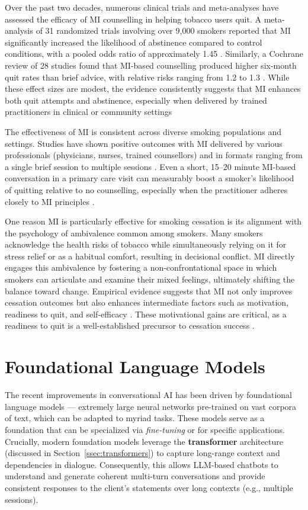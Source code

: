 Over the past two decades, numerous clinical trials and meta-analyses have assessed the efficacy of MI counselling in helping tobacco users quit. A meta-analysis of 31 randomized trials involving over 9,000 smokers reported that MI significantly increased the likelihood of abstinence compared to control conditions, with a pooled odds ratio of approximately 1.45 \cite{Heckman2010}. Similarly, a Cochrane review of 28 studies found that MI-based counselling produced higher six-month quit rates than brief advice, with relative risks ranging from 1.2 to 1.3 \cite{Lindson2015}. While these effect sizes are modest, the evidence consistently suggests that MI enhances both quit attempts and abstinence, especially when delivered by trained practitioners in clinical or community settings

The effectiveness of MI is consistent across diverse smoking populations and settings. Studies have shown positive outcomes with MI delivered by various professionals (physicians, nurses, trained counsellors) and in formats ranging from a single brief session to multiple sessions \cite{Lindson2015}. Even a short, 15–20 minute MI-based conversation in a primary care visit can measurably boost a smoker's likelihood of quitting relative to no counselling, especially when the practitioner adheres closely to MI principles \cite{zanjani2008effectiveness}. 


One reason MI is particularly effective for smoking cessation is its alignment with the psychology of ambivalence common among smokers. Many smokers acknowledge the health risks of tobacco while simultaneously relying on it for stress relief or as a habitual comfort, resulting in decisional conflict. MI directly engages this ambivalence by fostering a non-confrontational space in which smokers can articulate and examine their mixed feelings, ultimately shifting the balance toward change. Empirical evidence suggests that MI not only improves cessation outcomes but also enhances intermediate factors such as motivation, readiness to quit, and self-efficacy \cite{Boudreaux2012, Hettema2005}. These motivational gains are critical, as a readiness to quit is a well-established precursor to cessation success \cite{West2006}.




\section{Foundational Language Models} \label{sec:foundational_models}
The recent improvements in conversational AI has been driven by foundational language models \cite{stanfordCRFM2021} --- extremely large neural networks pre-trained on vast corpora of text, which can be adapted to myriad tasks. These models serve as a foundation that can be specialized via \emph{fine-tuning} or for specific applications. Crucially, modern foundation models leverage the \textbf{transformer} architecture (discussed in Section~\ref{ssec:transformers}) to capture long-range context and dependencies in dialogue. Consequently, this allows LLM-based chatbots to understand and generate coherent multi-turn conversations and provide consistent responses to the client's statements over long contexts (e.g., multiple sessions).

